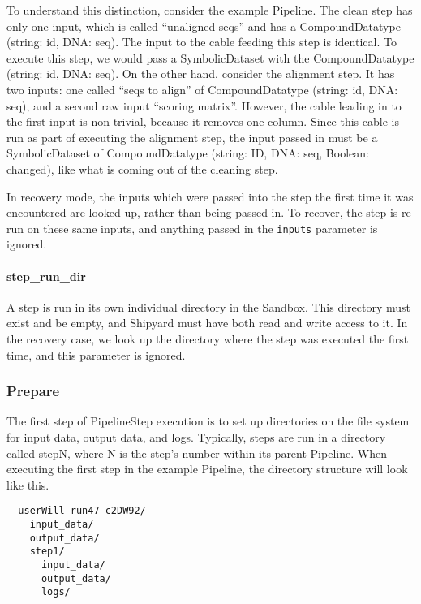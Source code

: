 \documentclass[12pt]{article}
\newcommand{\code}[1]{\texttt{#1}}
\begin{document}
To understand this distinction, consider the example Pipeline. The clean step
has only one input, which is called ``unaligned seqs'' and has a
CompoundDatatype (string: id, DNA: seq). The input to the cable feeding this
step is identical.  To execute this step, we would pass a SymbolicDataset with
the CompoundDatatype (string: id, DNA: seq). On the other hand, consider the
alignment step. It has two inputs: one called ``seqs to align'' of
CompoundDatatype (string: id, DNA: seq), and a second raw input ``scoring
matrix''. However, the cable leading in to the first input is non-trivial,
because it removes one column. Since this cable is run as part of executing the
alignment step, the input passed in must be a SymbolicDataset of
CompoundDatatype (string: ID, DNA: seq, Boolean: changed), like what is coming
out of the cleaning step.

In recovery mode, the inputs which were passed into the step the first time it
was encountered are looked up, rather than being passed in. To recover, the
step is re-run on these same inputs, and anything passed in the \code{inputs}
parameter is ignored.

\paragraph*{step\_run\_dir}

A step is run in its own individual directory in the Sandbox. This directory
must exist and be empty, and Shipyard must have both read and write access to
it. In the recovery case, we look up the directory where the step was executed
the first time, and this parameter is ignored.

\subsubsection*{Prepare}

The first step of PipelineStep execution is to set up directories on the file
system for input data, output data, and logs. Typically, steps are run in a
directory called stepN, where N is the step's number within its parent
Pipeline. When executing the first step in the example Pipeline, the directory
structure will look like this.

\begin{verbatim}
  userWill_run47_c2DW92/
    input_data/
    output_data/
    step1/
      input_data/
      output_data/
      logs/
\end{verbatim}
\end{document}
